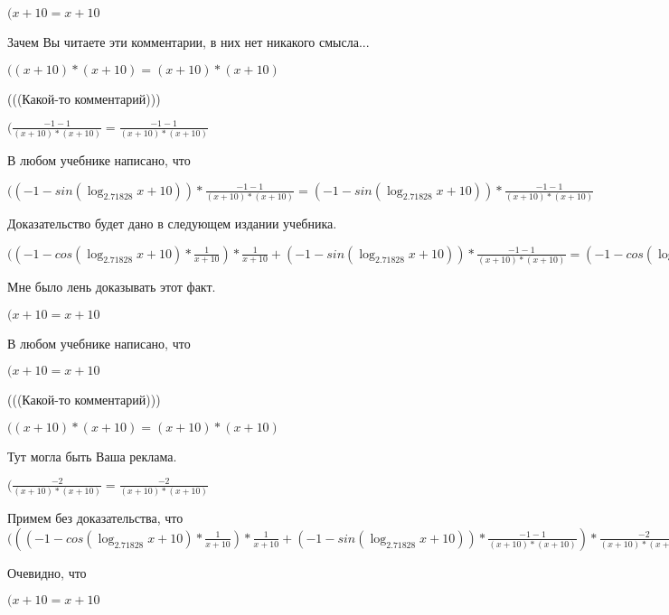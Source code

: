 \documentclass[12pt,a4paper,fleqn]{article}
\theoremstyle{definition}
\begin{document}
$( x  +  10  =  x  +  10 $

Зачем Вы читаете эти комментарии, в них нет никакого смысла...

$(( x  +  10 ) * ( x  +  10 ) = ( x  +  10 ) * ( x  +  10 )$

(((Какой-то комментарий)))

$(\frac{ -1  -  1 }{( x  +  10 ) * ( x  +  10 )}
 = \frac{ -1  -  1 }{( x  +  10 ) * ( x  +  10 )}
$

В любом учебнике написано, что

$(( -1  - sin(\log_{ 2.71828 }{ x  +  10 })) * \frac{ -1  -  1 }{( x  +  10 ) * ( x  +  10 )}
 = ( -1  - sin(\log_{ 2.71828 }{ x  +  10 })) * \frac{ -1  -  1 }{( x  +  10 ) * ( x  +  10 )}
$

Доказательство будет дано в следующем издании учебника.

$(( -1  - cos(\log_{ 2.71828 }{ x  +  10 }) * \frac{ 1 }{ x  +  10 }
) * \frac{ 1 }{ x  +  10 }
 + ( -1  - sin(\log_{ 2.71828 }{ x  +  10 })) * \frac{ -1  -  1 }{( x  +  10 ) * ( x  +  10 )}
 = ( -1  - cos(\log_{ 2.71828 }{ x  +  10 }) * \frac{ 1 }{ x  +  10 }
) * \frac{ 1 }{ x  +  10 }
 + ( -1  - sin(\log_{ 2.71828 }{ x  +  10 })) * \frac{ -1  -  1 }{( x  +  10 ) * ( x  +  10 )}
$

Мне было лень доказывать этот факт.

$( x  +  10  =  x  +  10 $

В любом учебнике написано, что

$( x  +  10  =  x  +  10 $

(((Какой-то комментарий)))

$(( x  +  10 ) * ( x  +  10 ) = ( x  +  10 ) * ( x  +  10 )$

Тут могла быть Ваша реклама.

$(\frac{ -2 }{( x  +  10 ) * ( x  +  10 )}
 = \frac{ -2 }{( x  +  10 ) * ( x  +  10 )}
$

Примем без доказательства, что
$((( -1  - cos(\log_{ 2.71828 }{ x  +  10 }) * \frac{ 1 }{ x  +  10 }
) * \frac{ 1 }{ x  +  10 }
 + ( -1  - sin(\log_{ 2.71828 }{ x  +  10 })) * \frac{ -1  -  1 }{( x  +  10 ) * ( x  +  10 )}
) * \frac{ -2 }{( x  +  10 ) * ( x  +  10 )}
 = (( -1  - cos(\log_{ 2.71828 }{ x  +  10 }) * \frac{ 1 }{ x  +  10 }
) * \frac{ 1 }{ x  +  10 }
 + ( -1  - sin(\log_{ 2.71828 }{ x  +  10 })) * \frac{ -1  -  1 }{( x  +  10 ) * ( x  +  10 )}
) * \frac{ -2 }{( x  +  10 ) * ( x  +  10 )}
$

Очевидно, что

$( x  +  10  =  x  +  10 $
\end{document}
